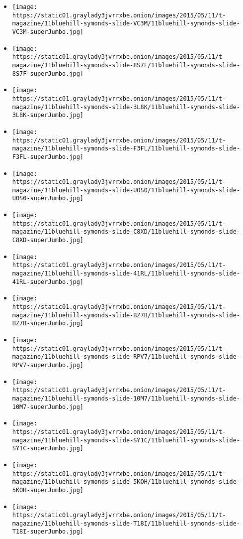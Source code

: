 \begin{itemize}
\item
  \texttt{[image: https://static01.graylady3jvrrxbe.onion/images/2015/05/11/t-magazine/11bluehill-symonds-slide-VC3M/11bluehill-symonds-slide-VC3M-superJumbo.jpg]}
\item
  \texttt{[image: https://static01.graylady3jvrrxbe.onion/images/2015/05/11/t-magazine/11bluehill-symonds-slide-8S7F/11bluehill-symonds-slide-8S7F-superJumbo.jpg]}
\item
  \texttt{[image: https://static01.graylady3jvrrxbe.onion/images/2015/05/11/t-magazine/11bluehill-symonds-slide-3L8K/11bluehill-symonds-slide-3L8K-superJumbo.jpg]}
\item
  \texttt{[image: https://static01.graylady3jvrrxbe.onion/images/2015/05/11/t-magazine/11bluehill-symonds-slide-F3FL/11bluehill-symonds-slide-F3FL-superJumbo.jpg]}
\item
  \texttt{[image: https://static01.graylady3jvrrxbe.onion/images/2015/05/11/t-magazine/11bluehill-symonds-slide-UOS0/11bluehill-symonds-slide-UOS0-superJumbo.jpg]}
\item
  \texttt{[image: https://static01.graylady3jvrrxbe.onion/images/2015/05/11/t-magazine/11bluehill-symonds-slide-C8XD/11bluehill-symonds-slide-C8XD-superJumbo.jpg]}
\item
  \texttt{[image: https://static01.graylady3jvrrxbe.onion/images/2015/05/11/t-magazine/11bluehill-symonds-slide-41RL/11bluehill-symonds-slide-41RL-superJumbo.jpg]}
\item
  \texttt{[image: https://static01.graylady3jvrrxbe.onion/images/2015/05/11/t-magazine/11bluehill-symonds-slide-BZ7B/11bluehill-symonds-slide-BZ7B-superJumbo.jpg]}
\item
  \texttt{[image: https://static01.graylady3jvrrxbe.onion/images/2015/05/11/t-magazine/11bluehill-symonds-slide-RPV7/11bluehill-symonds-slide-RPV7-superJumbo.jpg]}
\item
  \texttt{[image: https://static01.graylady3jvrrxbe.onion/images/2015/05/11/t-magazine/11bluehill-symonds-slide-10M7/11bluehill-symonds-slide-10M7-superJumbo.jpg]}
\item
  \texttt{[image: https://static01.graylady3jvrrxbe.onion/images/2015/05/11/t-magazine/11bluehill-symonds-slide-SY1C/11bluehill-symonds-slide-SY1C-superJumbo.jpg]}
\item
  \texttt{[image: https://static01.graylady3jvrrxbe.onion/images/2015/05/11/t-magazine/11bluehill-symonds-slide-5KOH/11bluehill-symonds-slide-5KOH-superJumbo.jpg]}
\item
  \texttt{[image: https://static01.graylady3jvrrxbe.onion/images/2015/05/11/t-magazine/11bluehill-symonds-slide-T18I/11bluehill-symonds-slide-T18I-superJumbo.jpg]}
\end{itemize}

